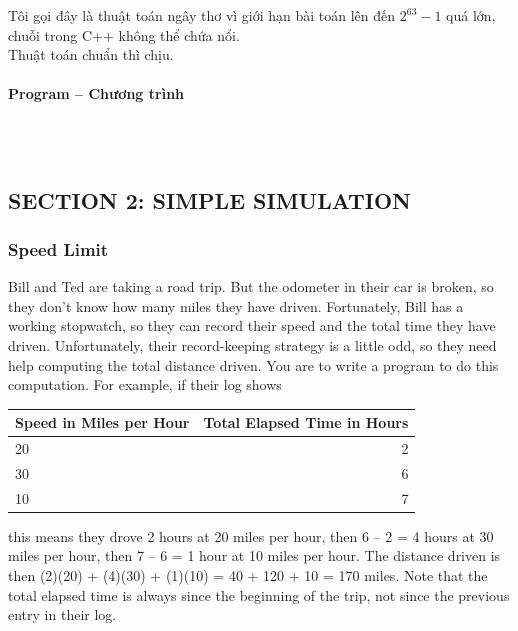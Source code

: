 \documentclass{article}
\begin{document}
Tôi gọi đây là thuật toán ngây thơ vì giới hạn bài toán lên đến $2^{63} - 1$ quá lớn, chuỗi trong C++ không thể chứa nổi.\\

Thuật toán chuẩn thì chịu.

\paragraph{Program -- Chương trình} \mbox{} \\


\begin{lstlisting}

\end{lstlisting}

\subsection{SECTION 2: SIMPLE SIMULATION}

\subsubsection{Speed Limit}

Bill and Ted are taking a road trip. But the odometer in their car is broken, so they don’t know how many miles they have driven. Fortunately, Bill has a working stopwatch, so they can record their speed and the total time they have driven. Unfortunately, their record-keeping strategy is a little odd, so they need help computing the total distance driven. You are to write a program to do this computation.
For example, if their log shows\\

\begin{table}[h]
    \centering
    \begin{tabular}{|l|r|}
        \hline
        \textbf{Speed in Miles per Hour} & \textbf{Total Elapsed Time in Hours} \\
        \hline
        20  & 2  \\ \hline
        30  & 6 \\ \hline
        10  & 7 \\  \hline
    \end{tabular}
\end{table}

this means they drove 2 hours at 20 miles per hour, then 6 – 2 = 4 hours at 30 miles per hour, then 7 – 6 = 1 hour at 10 miles per hour. The distance driven is then (2)(20) + (4)(30) + (1)(10) = 40 + 120 + 10 = 170 miles. Note that the total elapsed time is always since the beginning of the trip, not since the previous entry in their log.
\end{document}
